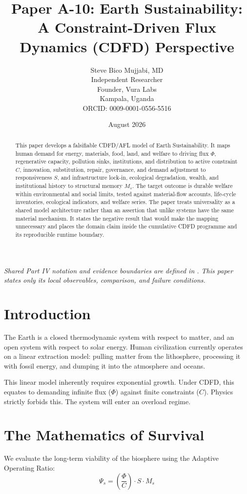 \documentclass[11pt,a4paper]{article}
\title{\textbf{Paper A-10: Earth Sustainability:\\ A Constraint-Driven Flux Dynamics (CDFD) Perspective}}
\author{Steve Bico Mujjabi, MD\\
\small Independent Researcher\\
\small Founder, Vura Labs\\
\small Kampala, Uganda\\
\small ORCID: 0009-0001-0556-5516}
\date{August 2026}
\begin{document}
\maketitle

\noindent\textit{Shared Part IV notation and evidence boundaries are defined in . This paper states only its local observables, comparison, and failure conditions.}


\begin{abstract}
This paper develops a falsifiable CDFD/AFL model of Earth Sustainability. It maps human demand for energy, materials, food, land, and welfare to driving flux $\Phi$, regenerative capacity, pollution sinks, institutions, and distribution to active constraint $C$, innovation, substitution, repair, governance, and demand adjustment to responsiveness $S$, and infrastructure lock-in, ecological degradation, wealth, and institutional history to structural memory $M_s$. The target outcome is durable welfare within environmental and social limits, tested against material-flow accounts, life-cycle inventories, ecological indicators, and welfare series. The paper treats universality as a shared model architecture rather than an assertion that unlike systems have the same material mechanism. It states the negative result that would make the mapping unnecessary and places the domain claim inside the cumulative CDFD programme and its reproducible runtime boundary.
\end{abstract}

\section{Introduction}

The Earth is a closed thermodynamic system with respect to matter, and an open system with respect to solar energy. Human civilization currently operates on a linear extraction model: pulling matter from the lithosphere, processing it with fossil energy, and dumping it into the atmosphere and oceans.

This linear model inherently requires exponential growth. Under CDFD, this equates to demanding infinite flux ($\Phi$) against finite constraints ($C$). Physics strictly forbids this. The system will enter an overload regime.

\section{The Mathematics of Survival}
We evaluate the long-term viability of the biosphere using the Adaptive Operating Ratio:
\begin{equation}
    \Psi_s = \left( \frac{\Phi}{C} \right) \cdot S \cdot M_s
\end{equation}
\end{document}
